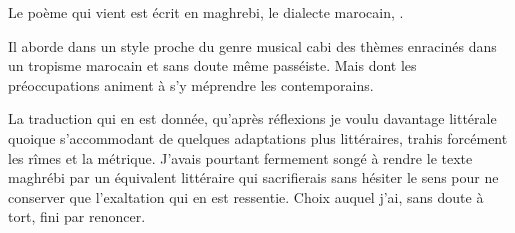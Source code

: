 \begin{prose}
  Le poème qui vient est écrit en maghrebi, le dialecte marocain, .

  Il aborde dans un style proche du genre musical cabi  des thèmes enracinés dans un tropisme marocain et sans doute même passéiste. Mais dont les préoccupations animent à s’y méprendre les contemporains.

  La traduction qui en est donnée, qu’après réflexions je voulu davantage littérale quoique s’accommodant de quelques adaptations plus littéraires, trahis forcément les rîmes et la métrique.
  J’avais pourtant fermement songé à rendre le texte maghrébi par un équivalent littéraire qui sacrifierais sans hésiter le sens pour ne conserver que l’exaltation qui en est ressentie. Choix auquel j’ai, sans doute à tort, fini par renoncer.
\end{prose}

